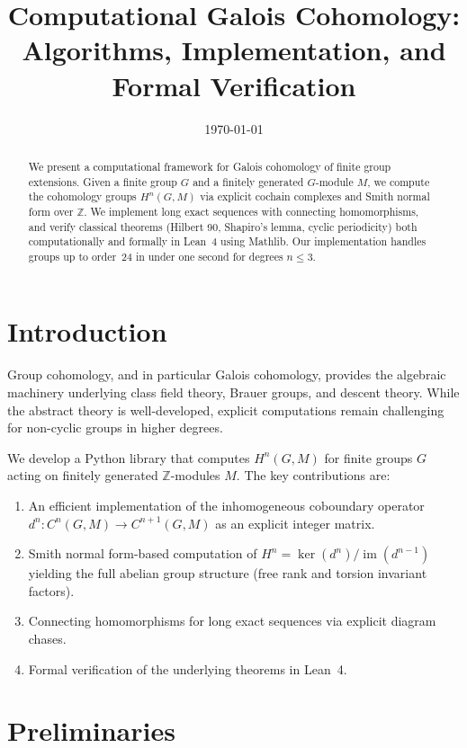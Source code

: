 \documentclass[11pt,a4paper]{article}
\title{Computational Galois Cohomology:\\
  Algorithms, Implementation, and Formal Verification}
\author{}
\date{\today}
\theoremstyle{definition}
\theoremstyle{remark}
\DeclareMathOperator{\im}{im}
\begin{document}
\maketitle

\begin{abstract}
We present a computational framework for Galois cohomology of finite
group extensions. Given a finite group $G$ and a finitely generated
$G$-module $M$, we compute the cohomology groups $H^n(G, M)$ via
explicit cochain complexes and Smith normal form over $\mathbb{Z}$.
We implement long exact sequences with connecting homomorphisms,
and verify classical theorems (Hilbert 90, Shapiro's lemma, cyclic
periodicity) both computationally and formally in Lean~4 using Mathlib.
Our implementation handles groups up to order~24 in under one second
for degrees $n \leq 3$.
\end{abstract}

\tableofcontents

\section{Introduction}\label{sec:intro}

Group cohomology, and in particular Galois cohomology, provides the
algebraic machinery underlying class field theory, Brauer groups, and
descent theory. While the abstract theory is well-developed, explicit
computations remain challenging for non-cyclic groups in higher degrees.

We develop a Python library that computes $H^n(G, M)$ for finite groups
$G$ acting on finitely generated $\mathbb{Z}$-modules $M$. The key
contributions are:

\begin{enumerate}
  \item An efficient implementation of the inhomogeneous coboundary
    operator $d^n: C^n(G, M) \to C^{n+1}(G, M)$ as an explicit
    integer matrix.
  \item Smith normal form-based computation of
    $H^n = \ker(d^n)/\im(d^{n-1})$ yielding the full abelian
    group structure (free rank and torsion invariant factors).
  \item Connecting homomorphisms for long exact sequences via
    explicit diagram chases.
  \item Formal verification of the underlying theorems in Lean~4.
\end{enumerate}

\section{Preliminaries}\label{sec:prelim}
\end{document}

